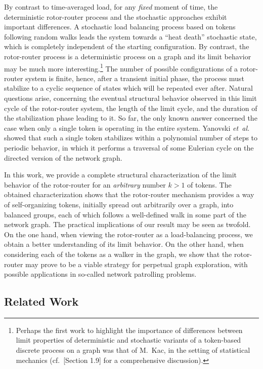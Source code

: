 \documentclass{article}[11pt,letter]
\newcommand{\etal}{{\it et~al.}}
\begin{document}
By contrast to time-averaged load, for any \emph{fixed} moment of time, the deterministic rotor-router process and the stochastic approaches exhibit important differences. A stochastic load balancing process based on tokens following random walks leads the system towards a ``heat death'' stochastic state, which is completely independent of the starting configuration. By contrast, the rotor-router process is a deterministic process on a graph and its limit behavior may be much more interesting.\footnote{Perhaps the first work to highlight the importance of differences between limit properties of deterministic and stochastic variants of a token-based discrete process on a graph was that of M.~Kac, in the setting of statistical mechanics (cf.~\cite{thompson2015mathematical}[Section 1.9] for a comprehensive discussion).} The number of possible configurations of a rotor-router system is finite, hence, after a transient initial phase, the process must stabilize to a cyclic sequence of states which will be repeated ever after. Natural questions arise, concerning the eventual structural behavior observed in this limit cycle of the rotor-router system, the length of the limit cycle, and the duration of the stabilization phase leading to it. So far, the only known answer concerned the case when only a single token is operating in the entire system. Yanovski \etal~\cite{YanovskiWB03} showed that such a single token stabilizes within a polynomial number of steps to periodic behavior, in which it performs a traversal of some Eulerian cycle on the directed version of the network graph.

In this work, we provide a complete structural characterization of the limit behavior of the rotor-router for an \emph{arbitrary} number $k>1$ of tokens. The obtained characterization shows that the rotor-router mechanism provides a way of self-organizing tokens, initially spread out arbitrarily over a graph, into balanced groups, each of which follows a well-defined walk in some part of the network graph. The practical implications of our result may be seen as twofold. On the one hand, when viewing the rotor-router as a load-balancing process, we obtain a better understanding of its limit behavior. On the other hand, when considering each of the tokens as a walker in the graph, we show that the rotor-router may prove to be a viable strategy for perpetual graph exploration, with possible applications in so-called network patrolling problems.

\subsection{Related Work}
\end{document}
